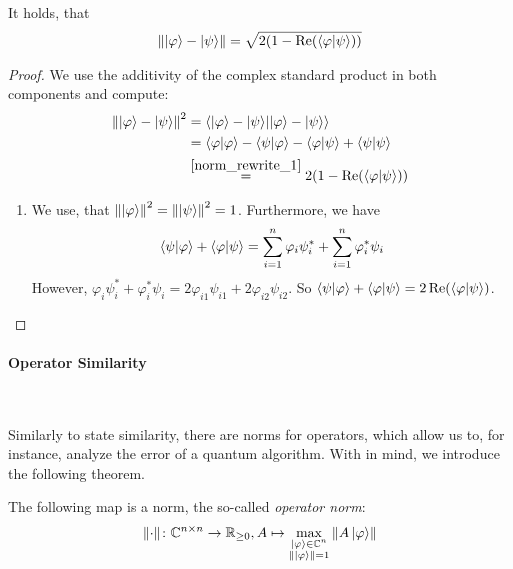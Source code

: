 \begin{theorem} \label{state_similarity_theorem}
    It holds, that
    \begin{align}
        \norm{\ket{\varphi}-\ket{\psi}} = \sqrt{2(1-\Re(\braket{\varphi}{\psi}))}
    \end{align}
\end{theorem}

\begin{proof}
    We use the additivity of the complex standard product in both components and compute:
    \begin{align}
        \norm{\ket{\varphi}-\ket{\psi}}^2 &= \braket{\ket{\varphi}-\ket{\psi}}{\ket{\varphi}-\ket{\psi}}\\
        &= \braket{\varphi}{\varphi}-\braket{\psi}{\varphi}-\braket{\varphi}{\psi}+\braket{\psi}{\psi}\\
        &\overset{\ref{norm_rewrite_1}}{=} 2(1-\Re(\braket{\varphi}{\psi}))
    \end{align}
    \begin{enumerate}[label=(\arabic*)]
        \item \label{norm_rewrite_1} We use, that \(\norm{\ket{\varphi}}^2 = \norm{\ket{\psi}}^2 = 1\). Furthermore, we have
        \begin{align}
            \braket{\psi}{\varphi}+\braket{\varphi}{\psi} = \sum_{i=1}^n \varphi_i\psi_i^* + \sum_{i=1}^n \varphi_i^*\psi_i
        \end{align}
        However, \(\varphi_i\psi_i^* + \varphi_i^*\psi_i = 2\varphi_{i1}\psi_{i1} + 2\varphi_{i2}\psi_{i2}\). So \(\braket{\psi}{\varphi}+\braket{\varphi}{\psi} = 2\Re(\braket{\varphi}{\psi})\).
    \end{enumerate}
\end{proof}

\paragraph*{Operator Similarity} \phantom{}\\\phantom{}

Similarly to state similarity, there are norms for operators, which allow us to, for instance, analyze the error of a quantum algorithm. With \cite[p. 51]{Werner2018} in mind, we introduce the following theorem.

\begin{theorem} \label{operator_norm}
    The following map is a norm, the so-called \emph{operator norm}:
    \begin{align}
        \norm{\cdot}\colon \mathbb{C}^{n \times n} \to \mathbb{R}_{\geq 0}, A \mapsto \max_{\substack{\ket{\varphi} \in \mathbb{C}^n\\\norm{\ket{\varphi}} = 1}} \norm{A\ket{\varphi}}
    \end{align}
\end{theorem}

